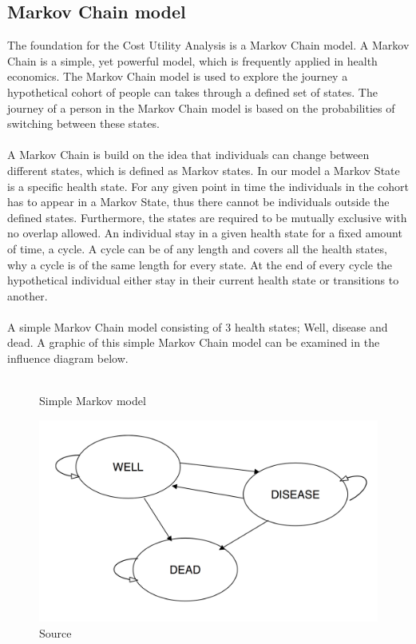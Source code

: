 \documentclass[a4paper,12pt]{article}
\begin{document}
\subsection{Markov Chain model}

The foundation for the Cost Utility Analysis is a Markov Chain model. A Markov Chain is a simple, yet powerful model, which is frequently applied in health economics. The Markov Chain model is used to explore the journey a hypothetical cohort of people can takes through a defined set of states. The journey of a person in the Markov Chain model is based on the probabilities of switching between these states.
\\\\
A Markov Chain is build on the idea that individuals can change between different states, which is defined as Markov states. In our model a Markov State is a specific health state. For any given point in time the individuals in the cohort has to appear in a Markov State, thus there cannot be individuals outside the defined states. Furthermore, the states are required to be mutually exclusive with no overlap allowed. An individual stay in a given health state for a fixed amount of time, a cycle. A cycle can be of any length and covers all the health states, why a cycle is of the same length for every state. At the end of every cycle the hypothetical individual either stay in their current health state or transitions to another.
\\\\
A simple Markov Chain model consisting of 3 health states; Well, disease and dead. A graphic of this simple Markov Chain model can be examined in the influence diagram below.
\\\\
\begin{figure}[h]
	\centering
	\caption[]{Simple Markov model}
	\label{fig:markov-simple}
	\includegraphics[width=0.7\linewidth]{"Pictures/Markov simple"}
	\caption*{Source}
\end{figure}
\end{document}
